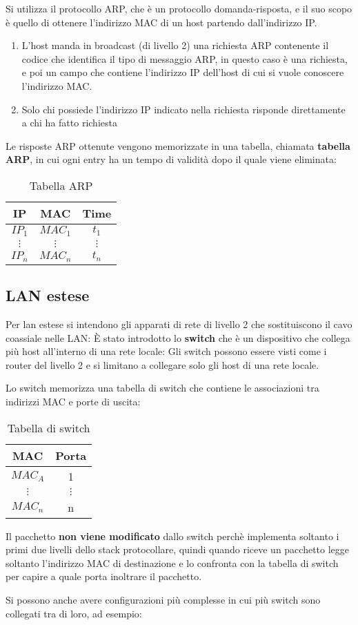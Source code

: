 \documentclass[a4paper]{article}
\begin{document}
Si utilizza il protocollo ARP, che è un protocollo domanda-risposta, e il suo scopo
è quello di ottenere l'indirizzo MAC di un host partendo dall'indirizzo IP.
\begin{enumerate}
  \item L'host manda in broadcast (di livello 2) una richiesta ARP contenente
    il codice che identifica il tipo di messaggio ARP, in questo caso è una richiesta,
    e poi un campo che contiene l'indirizzo IP dell'host di cui si vuole conoscere
    l'indirizzo MAC.
    \label{10-12-D1}

  \item Solo chi possiede l'indirizzo IP indicato nella richiesta risponde direttamente
    a chi ha fatto richiesta
    \label{10-12-D2}
\end{enumerate}
Le risposte ARP ottenute vengono memorizzate in una tabella, chiamata \textbf{tabella ARP},
in cui ogni entry ha un tempo di validità dopo il quale viene eliminata:
\begin{table}[H]
  \centering
  \begin{tabular}{|c|c|c|}
    \hline
    IP & MAC & Time \\
    \hline
    \( IP_1 \) & \( MAC_1 \) & \( t_1 \) \\
    \( \vdots \) & \( \vdots \) & \( \vdots \) \\
    \( IP_n \) & \( MAC_n \) & \( t_n \) \\
    \hline
  \end{tabular}
  \caption{Tabella ARP}
\end{table}

\subsection{LAN estese}
Per lan estese si intendono gli apparati di rete di livello 2 che sostituiscono il cavo
coassiale nelle LAN:
\label{10-12-D3}
\noindent
È stato introdotto lo \textbf{switch} che è un dispositivo che collega più host
all'interno di una rete locale:
\label{10-12-D4}
\noindent
Gli switch possono essere visti come i router del livello 2 e si limitano a
collegare solo gli host di una rete locale.

Lo switch memorizza una tabella di switch che contiene le associazioni tra indirizzi
MAC e porte di uscita:
\begin{table}[H]
  \centering
  \begin{tabular}{|c|c|}
    \hline
    MAC & Porta \\
    \hline
    \( MAC_A \) & 1 \\
    \( \vdots \) & \( \vdots \) \\
    \( MAC_n \) & n \\
    \hline
  \end{tabular}
  \caption{Tabella di switch}
\end{table}
\noindent
Il pacchetto \textbf{non viene modificato} dallo switch perchè implementa soltanto
i primi due livelli dello stack protocollare, quindi quando riceve un pacchetto
legge soltanto l'indirizzo MAC di destinazione e lo confronta con la tabella di switch
per capire a quale porta inoltrare il pacchetto.

\vspace{1em}
\noindent
Si possono anche avere configurazioni più complesse in cui più switch sono collegati
tra di loro, ad esempio:
\label{10-12-D5}
\end{document}
